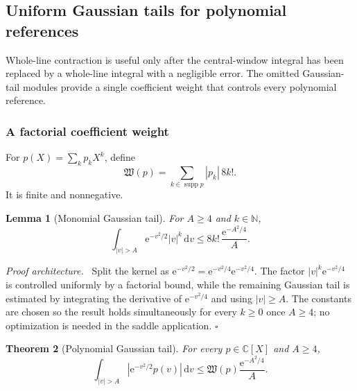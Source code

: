 \documentclass[11pt,oneside]{article}
\newtheorem{theorem}{Theorem}[section]
\newtheorem{lemma}[theorem]{Lemma}
\theoremstyle{definition}
\theoremstyle{remark}
\newcommand{\C}{\mathbb C}
\newcommand{\N}{\mathbb N}
\newcommand{\e}{\mathrm e}
\newcommand{\dd}{\,\mathrm d}
\newcommand{\supp}{\operatorname{supp}}
\newenvironment{proofidea}{\par\smallskip\noindent\textit{Proof architecture.}\ }{\hfill$\square$\par\smallskip}
\begin{document}
\subsection{Uniform Gaussian tails for polynomial references}
\label{integration:sec:gaussian-tails}

Whole-line contraction is useful only after the central-window integral has been replaced by
a whole-line integral with a negligible error.  The omitted Gaussian-tail modules provide a
single coefficient weight that controls every polynomial reference.

\subsubsection{A factorial coefficient weight}

For $p(X)=\sum_kp_kX^k$, define
\begin{equation}
 \mathfrak W(p)=\sum_{k\in\supp p}|p_k|\,8k!.
 \label{integration:eq:gaussian-tail-weight}
\end{equation}
It is finite and nonnegative.

\begin{lemma}[Monomial Gaussian tail]
\label{integration:lem:monomial-gaussian-tail}
For $A\ge4$ and $k\in\N$,
\begin{equation}
 \int_{|v|>A}\e^{-v^2/2}|v|^k\dd v
 \le 8k!\,\frac{\e^{-A^2/4}}{A}.
 \label{integration:eq:monomial-gaussian-tail}
\end{equation}
\end{lemma}

\begin{proofidea}
Split the kernel as
$\e^{-v^2/2}=\e^{-v^2/4}\e^{-v^2/4}$.  The factor
$|v|^k\e^{-v^2/4}$ is controlled uniformly by a factorial bound, while the remaining
Gaussian tail is estimated by integrating the derivative of $\e^{-v^2/4}$ and using
$|v|\ge A$.  The constants are chosen so the result holds simultaneously for every
$k\ge0$ once $A\ge4$; no optimization is needed in the saddle application.
\end{proofidea}

\begin{theorem}[Polynomial Gaussian tail]
\label{integration:thm:polynomial-gaussian-tail}
For every $p\in\C[X]$ and $A\ge4$,
\begin{equation}
 \int_{|v|>A}\left|\e^{-v^2/2}p(v)\right|\dd v
 \le \mathfrak W(p)\frac{\e^{-A^2/4}}{A}.
 \label{integration:eq:polynomial-gaussian-tail}
\end{equation}
\end{theorem}
\end{document}
